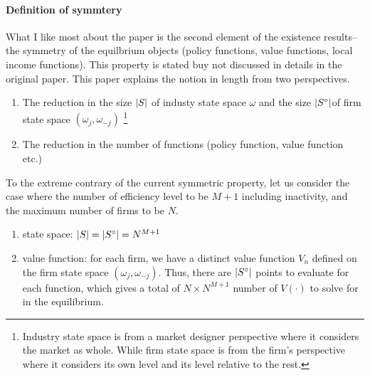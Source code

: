 \documentclass[12pt]{article}[margin=1in]
\begin{document}
\paragraph{Definition of symmtery} What I like most about the paper is the second element of the existence results--the symmetry of the equilbrium objects (policy functions, value functions, local income functions). This property is stated buy not discussed in details in the original \citet{ericson1995markov} paper. This paper explains the notion in length from two perspectives. 
\begin{enumerate}
    \item The reduction in the size $\left| S\right|$ of industy state space $\omega$ and the size $\left| S^\circ\right|$of firm state space $(\omega_j,\omega_{-j})$ \footnote{Industry state space is from a market designer perspective where it considers the market as whole. While firm state space is from the firm's perspective where it considers its own level and its level relative to the rest.}
    \item The reduction in the number of functions (policy function, value function etc.)
\end{enumerate}
To the extreme contrary of the current symmetric property, let us consider the case where the number of efficiency level to be $M+1$ including inactivity, and the maximum number of firms to be $N$. 
\begin{enumerate}
    \item state space: $\left| S\right|=\left| S^\circ\right| = N^{M+1}$
    \item value function: for each firm, we have a distinct value function $V_n$ defined on the firm state space $(\omega_j,\omega_{-j})$. Thus, there are $\left| S^\circ\right|$ points to evaluate for each function, which gives a total of $N\times N^{M+1}$ number of $V(\cdot)$ to solve for in the equilibrium.
\end{enumerate}
\end{document}
